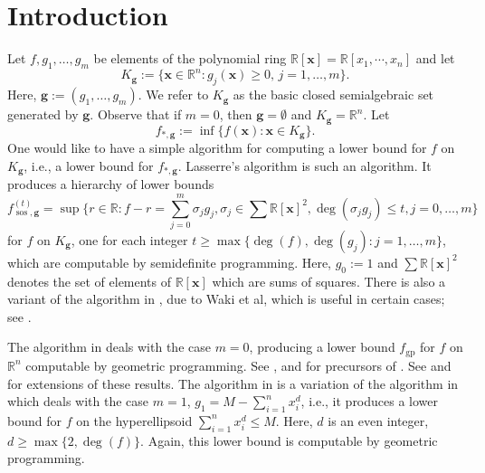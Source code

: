 \documentclass{amsart}
\theoremstyle{definition}
\begin{document}
\section{Introduction}
%
Let $f,g_1,\dots,g_m$ be elements of the polynomial ring $\mathbb{R}[\mathbf{x}]=\mathbb{R}[x_1,\cdots,x_n]$ and let
\[
	K_{\mathbf{g}} := \{ \mathbf{x} \in \mathbb{R}^n : g_j(\mathbf{x})\ge 0, \, j=1,\dots,m\}.
\]
Here,  $\mathbf{g} := (g_1,\dots, g_m)$. We refer to $K_{\mathbf{g}}$ as the basic closed semialgebraic set generated by
$\mathbf{g}$. Observe that if $m=0$, then $\mathbf{g}=\emptyset$ and $K_{\mathbf{g}}= \mathbb{R}^n$. Let
\[
	f_{*,\mathbf{g}}:= \inf\{ f(\mathbf{x}) : \mathbf{x} \in K_{\mathbf{g}}\}.
\]
One would like to have a simple algorithm for computing a lower bound for $f$ on $K_{\mathbf{g}}$, i.e., a lower bound
for $f_{*,\mathbf{g}}$. Lasserre's algorithm \cite{lasserre1} is such an algorithm. It produces a hierarchy of lower bounds
\[
	f_{\operatorname{sos},\mathbf{g}}^{(t)} = \sup \{ r \in \mathbb{R} : f-r = \sum_{j=0}^m \sigma_jg_j, \sigma_j \in \sum \mathbb{R}[\mathbf{x}]^2, \deg(\sigma_jg_j)\le t, j=0,\dots,m \}
\]
for $f$ on $K_{\mathbf{g}}$, one for each integer $t\ge \max\{ \deg(f), \deg(g_j): j=1,\dots,m\}$, which are computable
by semidefinite programming. Here, $g_0:=1$ and $\sum \mathbb{R}[\mathbf{x}]^2$ denotes the set of elements of
$\mathbb{R}[\mathbf{x}]$ which are sums of squares. There is also a variant of the algorithm in \cite{lasserre1}, due to Waki et al, which is useful in certain cases; see \cite{WKKM}.

The algorithm in \cite{gha-mar2} deals with the case $m=0$, producing a lower bound $f_{\operatorname{gp}}$ for $f$
on $\mathbb{R}^n$ computable by geometric programming.\footnotemark{}
See \cite{fidalgo}, \cite{gha-mar1} and \cite{lasserre} for
precursors of \cite{gha-mar2}. See \cite{DT} and \cite{IW} for extensions of these results.  The algorithm in \cite{gha-lass-mar} is a variation of the algorithm in \cite{gha-mar2}
which deals with the case $m=1$, $g_1 = M-\sum_{i=1}^n x_i^d$, i.e., it produces a lower bound for $f$ on the
hyperellipsoid $\sum_{i=1}^n x_i^d\le M$. Here, $d$ is an even integer, $d \ge \max\{ 2, \deg(f)\}$. Again, this lower bound is computable by geometric programming.
\end{document}

